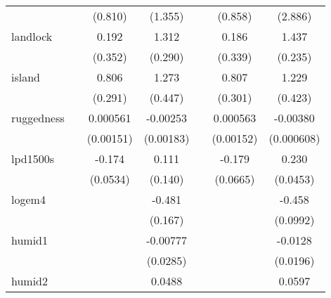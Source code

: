 {\begin{tabular}{l*{6}{c}}
            &                     &     (0.810)         &     (1.355)         &                     &     (0.858)         &     (2.886)         \\
[1em]
landlock    &                     &       0.192         &       1.312\sym{**} &                     &       0.186         &       1.437\sym{***}\\
            &                     &     (0.352)         &     (0.290)         &                     &     (0.339)         &     (0.235)         \\
[1em]
island      &                     &       0.806\sym{**} &       1.273\sym{**} &                     &       0.807\sym{**} &       1.229\sym{**} \\
            &                     &     (0.291)         &     (0.447)         &                     &     (0.301)         &     (0.423)         \\
[1em]
ruggedness  &                     &    0.000561         &    -0.00253         &                     &    0.000563         &    -0.00380\sym{***}\\
            &                     &   (0.00151)         &   (0.00183)         &                     &   (0.00152)         &  (0.000608)         \\
[1em]
lpd1500s    &                     &      -0.174\sym{**} &       0.111         &                     &      -0.179\sym{**} &       0.230\sym{***}\\
            &                     &    (0.0534)         &     (0.140)         &                     &    (0.0665)         &    (0.0453)         \\
[1em]
logem4      &                     &                     &      -0.481\sym{**} &                     &                     &      -0.458\sym{***}\\
            &                     &                     &     (0.167)         &                     &                     &    (0.0992)         \\
[1em]
humid1      &                     &                     &    -0.00777         &                     &                     &     -0.0128         \\
            &                     &                     &    (0.0285)         &                     &                     &    (0.0196)         \\
[1em]
humid2      &                     &                     &      0.0488         &                     &                     &      0.0597\sym{**} \\

\end{tabular}}
